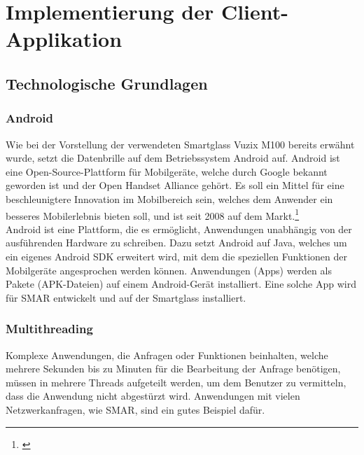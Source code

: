 \chapter{Implementierung der Client-Applikation}
\label{cha:impl_device}

\section{Technologische Grundlagen}
\subsection{Android}
Wie bei der Vorstellung der verwendeten Smartglass Vuzix M100 bereits erwähnt wurde, setzt die Datenbrille auf dem Betriebssystem Android auf. Android ist eine Open-Source-Plattform für Mobilgeräte, welche durch Google bekannt geworden ist und der Open Handset Alliance gehört. Es soll ein Mittel für eine beschleunigtere Innovation im Mobilbereich sein, welches dem Anwender ein besseres Mobilerlebnis bieten soll, und ist seit 2008 auf dem Markt.\footnote{\citep{android_general}}\\
Android ist eine Plattform, die es ermöglicht, Anwendungen unabhängig von der ausführenden Hardware zu schreiben. Dazu setzt Android auf Java, welches um ein eigenes Android SDK erweitert wird, mit dem die speziellen Funktionen der Mobilgeräte angesprochen werden können. Anwendungen (Apps) werden als Pakete (APK-Dateien) auf einem Android-Gerät installiert. Eine solche App wird für \acs{SMAR} entwickelt und auf der Smartglass installiert.

\subsection{Multithreading}
Komplexe Anwendungen, die Anfragen oder Funktionen beinhalten, welche mehrere Sekunden bis zu Minuten für die Bearbeitung der Anfrage benötigen, müssen in mehrere Threads aufgeteilt werden, um dem Benutzer zu vermitteln, dass die Anwendung nicht abgestürzt wird. Anwendungen mit vielen Netzwerkanfragen, wie \zB \ac{SMAR}, sind ein gutes Beispiel dafür.\\

